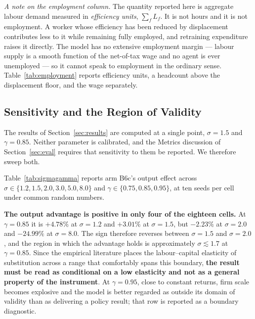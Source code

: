 \documentclass[journal]{IEEEtran}
\theoremstyle{plain}
\theoremstyle{definition}
\begin{document}
\emph{A note on the employment column.} The quantity reported here is aggregate
labour demand measured in \emph{efficiency units}, $\sum_f L_f$. It is not hours
and it is not employment. A worker whose efficiency has been reduced by
displacement contributes less to it while remaining fully employed, and
retraining expenditure raises it directly. The model has no extensive
employment margin --- labour supply is a smooth function of the net-of-tax wage
and no agent is ever unemployed --- so it cannot speak to employment in the
ordinary sense. Table~\ref{tab:employment} reports efficiency units, a headcount
above the displacement floor, and the wage separately.







\subsection{Sensitivity and the Region of Validity}
\label{sec:sensitivity}

The results of Section~\ref{sec:results} are computed at a single point,
$\sigma = 1.5$ and $\gamma = 0.85$. Neither parameter is calibrated, and the
Metrics discussion of Section~\ref{sec:eval} requires that sensitivity to them
be reported. We therefore sweep both.

Table~\ref{tab:sigmagamma} reports arm B6c's output effect across
$\sigma \in \{1.2, 1.5, 2.0, 3.0, 5.0, 8.0\}$ and
$\gamma \in \{0.75, 0.85, 0.95\}$, at ten seeds per cell under common random
numbers.

\textbf{The output advantage is positive in only four of the eighteen cells.}
At $\gamma = 0.85$ it is $+4.78\%$ at $\sigma = 1.2$ and $+3.01\%$ at
$\sigma = 1.5$, but $-2.23\%$ at $\sigma = 2.0$ and $-24.99\%$ at
$\sigma = 8.0$. The sign therefore reverses between $\sigma = 1.5$ and
$\sigma = 2.0$, and the region in which the advantage holds is approximately
$\sigma \lesssim 1.7$ at $\gamma = 0.85$. Since the empirical literature places
the labour--capital elasticity of substitution across a range that comfortably
spans this boundary, \textbf{the result must be read as conditional on a low
elasticity and not as a general property of the instrument}. At
$\gamma = 0.95$, close to constant returns, firm scale becomes explosive and the
model is better regarded as outside its domain of validity than as delivering a
policy result; that row is reported as a boundary diagnostic.
\end{document}
